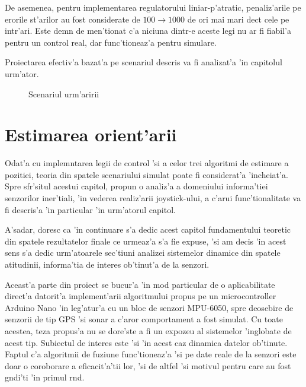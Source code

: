 \documentclass[12pt,a4paper,twoside]{report}
\begin{document}
\vspace{5px}

De asemenea, pentru implementarea regulatorului liniar-p'atratic, penaliz'arile pe erorile st'arilor au fost considerate de $100 \to 1000$ de ori mai mari dec\ia t cele pe intr'ari. Este demn de men'tionat c'a niciuna dintr-e aceste legi nu ar fi fiabil'a pentru un control real, dar func'tioneaz'a pentru simulare. 

\vspace{5px}

Proiectarea efectiv'a bazat'a pe scenariul descris va fi analizat'a 'in capitolul urm'ator. 

\begin{figure}[h]
\centering
  
  \caption{Scenariul urm'aririi}
\end{figure}

\section{Estimarea orient'arii}

Odat'a cu implemntarea legii de control 'si a celor trei algoritmi de estimare a pozitiei, teoria din spatele scenariului simulat poate fi considerat'a 'incheiat'a. Spre sf\ia r'situl acestui capitol, propun o analiz'a a domeniului informa'tiei senzorilor iner'tiali, 'in vederea realiz'arii joystick-ului, a c'arui func'tionalitate va fi descris'a 'in particular 'in urm'atorul capitol. 

\vspace{5px}

A'sadar, doresc ca 'in continuare s'a dedic acest capitol fundamentului teoretic din spatele rezultatelor finale ce urmeaz'a s'a fie expuse, 'si am decis 'in acest sens s'a dedic urm'atoarele sec'tiuni analizei sistemelor dinamice din spatele atitudinii, informa'tia de interes ob'tinut'a de la senzori. 

\vspace{5px}

Aceast'a parte din proiect se bucur'a 'in mod particular de o aplicabilitate direct'a datorit'a implement'arii algoritmului propus pe un microcontroller Arduino Nano 'in leg'atur'a cu un bloc de senzori MPU-6050, spre deosebire de senzorii de tip GPS 'si sonar a c'aror comportament a fost simulat. Cu toate acestea, teza propus'a nu se dore'ste a fi un expozeu al sistemelor 'inglobate de acest tip. Subiectul de interes este 'si 'in acest caz dinamica datelor ob'tinute. Faptul c'a algoritmii de fuziune func'tioneaz'a 'si pe date reale de la senzori este doar o coroborare a eficacit'a'tii lor, 'si de altfel 'si motivul pentru care au fost g\ia ndi'ti 'in primul r\ia nd.  
\end{document}
